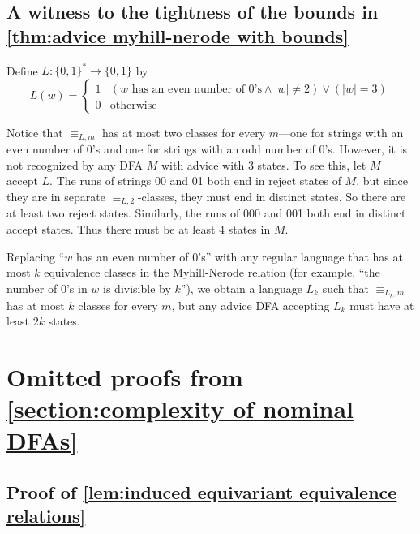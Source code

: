 \documentclass[runningheads]{llncs}
\begin{document}
\subsection{A witness to the tightness of the bounds in \autoref{thm:advice myhill-nerode with bounds}} \label{appendix:witness to tightness of advice myhill-nerode bounds}

\begin{example}
    Define $L : \{0,1\}^* \to \{0,1\}$ by 
    \[
      L(w) = \begin{cases} 1 & (w \text{ has an even number of 0's} \land |w| \neq 2) \lor (|w| = 3) \\
                           0 & \text{otherwise} \end{cases}
    \]
  \end{example}
  
  
  Notice that $\equiv_{L,m}$ has at most two classes for every $m$---one for strings with an even number of 0's and one for strings with an odd number of 0's.
  However, it is not recognized by any DFA $M$ with advice with 3 states. 
  To see this, let $M$ accept $L$.
  The runs of strings 00 and 01 both end in reject states of $M$, but since they are in separate $\equiv_{L,2}$-classes, they must end in distinct states. 
  So there are at least two reject states.
  Similarly, the runs of 000 and 001 both end in distinct accept states. 
  Thus there must be at least 4 states in $M$.
  
  Replacing ``$w$ has an even number of 0's'' with any regular language that has at most $k$ equivalence classes in the Myhill-Nerode relation (for example, ``the number of 0's in $w$ is divisible by $k$''), we obtain a language $L_k$ such that $\equiv_{L_k,m}$ has at most $k$ classes for every $m$, but any advice DFA accepting $L_k$ must have at least $2k$ states.

  \section{Omitted proofs from \autoref{section:complexity of nominal DFAs}} \label{appendix:nominal DFAs omitted proofs}

  \subsection{Proof of \autoref{lem:induced equivariant equivalence relations}} \label{appendix:proof of induced equivariant equivalence relations}
\end{document}
